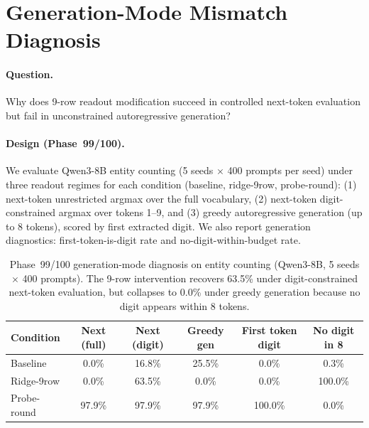 \documentclass{article}
\begin{document}
\section{Generation-Mode Mismatch Diagnosis}
\label{sec:genmode_mismatch}


\paragraph{Question.}
Why does 9-row readout modification succeed in controlled next-token evaluation
but fail in unconstrained autoregressive generation?

\paragraph{Design (Phase~99/100).}
We evaluate Qwen3-8B entity counting (5 seeds $\times$ 400 prompts per seed)
under three readout regimes for each condition (baseline, ridge-9row, probe-round):
(1) next-token unrestricted argmax over the full vocabulary,
(2) next-token digit-constrained argmax over tokens 1--9,
and (3) greedy autoregressive generation (up to 8 tokens), scored by first extracted digit.
We also report generation diagnostics: first-token-is-digit rate and no-digit-within-budget rate.

\begin{table}[h]
\centering
\caption{Phase~99/100 generation-mode diagnosis on entity counting (Qwen3-8B, 5 seeds $\times$ 400 prompts).
The 9-row intervention recovers 63.5\% under digit-constrained next-token evaluation,
but collapses to 0.0\% under greedy generation because no digit appears within 8 tokens.
}
\label{tab:genmode_mismatch}
\small
\begin{tabular}{lccccc}
\toprule
Condition & Next (full) & Next (digit) & Greedy gen & First token digit & No digit in 8 \\
\midrule
Baseline & 0.0\% & 16.8\% & 25.5\% & 0.0\% & 0.3\% \\
Ridge-9row & 0.0\% & 63.5\% & 0.0\% & 0.0\% & 100.0\% \\
Probe-round & 97.9\% & 97.9\% & 97.9\% & 100.0\% & 0.0\% \\
\bottomrule
\end{tabular}
\end{table}
\end{document}

